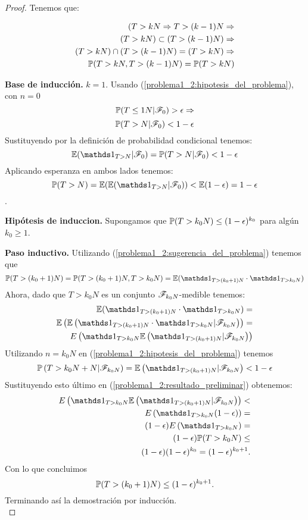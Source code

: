 \begin{proof}
	Tenemos que: 
	
	\begin{align}
		(T>kN \Rightarrow T>(k-1)N \Rightarrow \\
		(T>kN) \subset (T>(k-1)N) \Rightarrow \\
		(T>kN) \cap (T>(k-1)N) = (T>kN) \Rightarrow \\
		\mathbb{P}(T>kN, T>(k-1)N) = \mathbb{P}(T>kN)	
	\end{align}
		
	\textbf{Base de inducción.} $k=1$. Usando (\ref{problema1_2:hipotesis_del_problema}), con $n=0$ 
		$$\mathbb{P}(T\leq 1N | \mathscr{F}_0) > \epsilon\Rightarrow$$
		$$\mathbb{P}(T>N| \mathscr{F}_0) < 1 - \epsilon$$
	Sustituyendo por la definición de probabilidad condicional tenemos:
		$$ \E(\indic_{T>N} | \F_0)= \mw(T>N| \F_0) < 1 - \epsilon$$
	Aplicando esperanza en ambos lados tenemos:
		$$ \mw(T>N) = \E(\E(\indic_{T>N} | \F_0)) < \E(1 - \epsilon) = 1 - \epsilon$$.
	
	\textbf{Hipótesis de induccion.} Supongamos que $\mathbb{P}(T>k_0N)\leq(1 - \epsilon)^{k_0}$ para algún $k_0 \geq 1$.
	
	\textbf{Paso inductivo.} 
	Utilizando (\ref{problema1_2:sugerencia_del_problema}) tenemos que
		$$\mw(T>(k_0+1)N) = \mw(T>(k_0+1)N, T>k_0N) = \E(\indic_{T>(k_0+1)N} \cdot \indic_{T>k_0N})$$
	Ahora, dado que $T>k_0N$ es un conjunto $\mathscr{F}_{k_0N}$-medible tenemos:
	\begin{align} 
		\E(\indic_{T>(k_0+1)N} \cdot \indic_{T>k_0N}) = \\ 
		\E\left(\E\left(\indic_{T>(k_0+1)N} \cdot \indic_{T>k_0N} | \F_{k_0N}\right)\right) = \\
		 E\left(\indic_{T>k_0N} \E\left(\indic_{T>(k_0+1)N}|\F_{k_0N}\right)\right) \label{problema1_2:resultado_preliminar}
	\end{align}
	Utilizando  $n=k_0N$ en (\ref{problema1_2:hipotesis_del_problema}) tenemos
	$$\mw\left(T>k_0N+N|\F_{k_0N}\right) = \E\left(\indic_{T>(k_0+1)N}|\F_{k_0N}\right) < 1-\epsilon$$
	Sustituyendo esto último en (\ref{problema1_2:resultado_preliminar}) obtenemos:
	\begin{align}
			 E\left(\indic_{T>k_0N} \E\left(\indic_{T>(k_0+1)N}|\F_{k_0N}\right)\right) <\\
	 		 E\left(\indic_{T>k_0N} (1-\epsilon)\right) = \\
	 		 (1-\epsilon) E\left(\indic_{T>k_0N} \right) = \\
	 		 (1-\epsilon) \mw(T>k_0N) \leq \\
			 (1-\epsilon)(1-\epsilon)^{k_0} = (1-\epsilon)^{k_0 + 1}.
	\end{align}
	Con lo que concluimos
		$$\mathbb{P}(T>(k_0+1)N) \leq (1-\epsilon)^{k_0 + 1}.$$
	Terminando así la demostración por inducción.\\
	

\end{proof}
